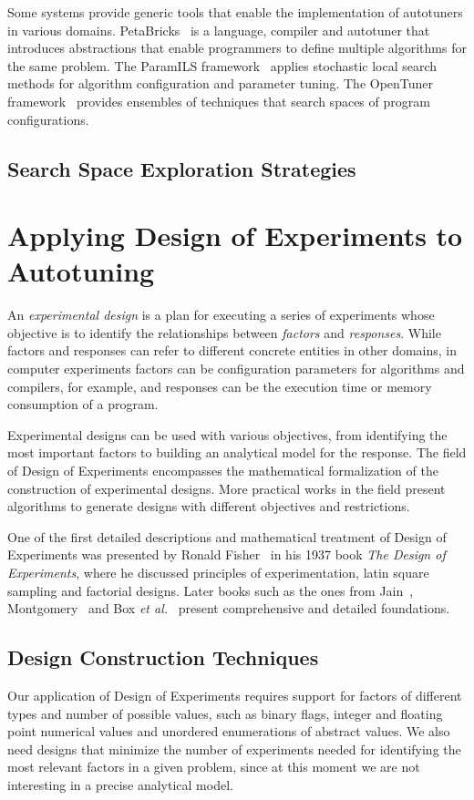 \documentclass[conference]{IEEEtran}
\begin{document}
Some systems provide generic tools that enable the implementation of autotuners
in various domains. PetaBricks~\cite{ansel2009petabricks} is a language,
compiler and autotuner that introduces abstractions that enable programmers to
define multiple algorithms for the same problem. The ParamILS
framework~\cite{hutter2009paramils} applies stochastic local search methods for
algorithm configuration and parameter tuning. The OpenTuner
framework~\cite{ansel2014opentuner} provides ensembles of techniques that search
spaces of program configurations.
\subsection{Search Space Exploration Strategies}
\label{sec:org6183539}
\section{Applying Design of Experiments to Autotuning}
\label{sec:org38b9a39}
An \emph{experimental design} is a plan for executing a series of experiments
whose objective is to identify the relationships between \emph{factors} and
\emph{responses}. While factors and responses can refer to different concrete
entities in other domains, in computer experiments factors can be configuration
parameters for algorithms and compilers, for example, and responses can be the
execution time or memory consumption of a program.

Experimental designs can be used with various objectives, from identifying the
most important factors to building an analytical model for the response. The
field of Design of Experiments encompasses the mathematical formalization of
the construction of experimental designs. More practical works in the field
present algorithms to generate designs with different objectives and
restrictions.

One of the first detailed descriptions and mathematical treatment of Design of
Experiments was presented by Ronald Fisher~\cite{fisher1937design} in his
1937 book \emph{The Design of Experiments}, where he discussed principles of
experimentation, latin square sampling and factorial designs. Later books such
as the ones from Jain~\cite{bukh1992art},
Montgomery~\cite{montgomery2017design} and Box \emph{et
al.}~\cite{box2005statistics} present comprehensive and detailed
foundations.
\subsection{Design Construction Techniques}
\label{sec:org571b2d6}
Our application of Design of Experiments requires support for factors of
different types and number of possible values, such as binary flags, integer
and floating point numerical values and unordered enumerations of abstract
values. We also need designs that minimize the number of experiments needed for
identifying the most relevant factors in a given problem, since at this moment
we are not interesting in a precise analytical model.
\end{document}
